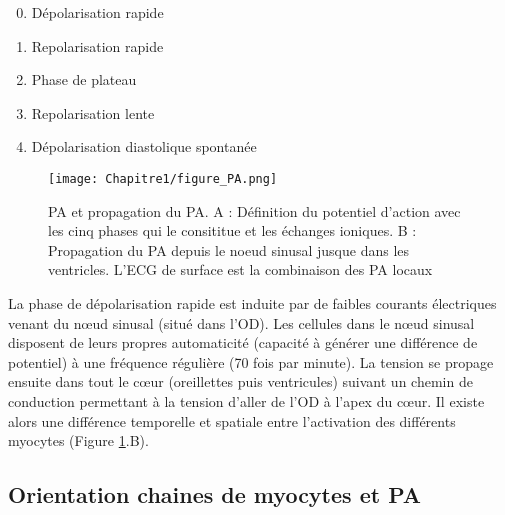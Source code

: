 \begin{enumerate}
\setcounter{enumi}{-1}
\item Dépolarisation rapide
\item Repolarisation rapide
\item Phase de plateau
\item Repolarisation lente
\item Dépolarisation diastolique spontanée
\end{enumerate}

\begin{figure}[!htbp]
  \begin{center}
    \texttt{[image: Chapitre1/figure\_PA.png]}
     \end{center}
    \caption{PA et propagation du PA. A : Définition du potentiel d'action avec les cinq phases qui le consititue et les échanges ioniques. B : Propagation du PA depuis le noeud sinusal jusque dans les ventricles. L'ECG de surface est la combinaison des PA locaux}
  \label{fig:fig_PA}
\end{figure}

La phase de dépolarisation rapide est induite par de faibles courants électriques venant du nœud sinusal (situé dans l’OD). Les cellules dans le nœud sinusal disposent de leurs propres automaticité (capacité à générer une différence de potentiel) à une fréquence régulière (70 fois par minute). La tension se propage ensuite dans tout le cœur (oreillettes puis ventricules) suivant un chemin de conduction permettant à la tension d’aller de l’OD à l’apex du cœur. Il existe alors une différence temporelle et spatiale entre l’activation des différents myocytes (Figure \ref{fig:fig_PA}.B).\\


\subsection{Orientation chaines de myocytes et PA}

